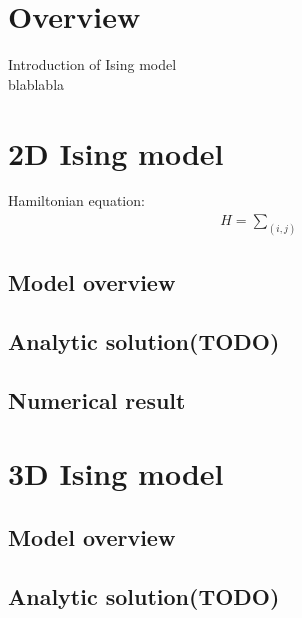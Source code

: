 \documentclass[%
 reprint,
 amsmath,amssymb,
 aps,
]{revtex4-1}
\begin{document}
\maketitle


\section{\label{sec:level1}Overview}
Introduction of Ising model\\

blablabla

\section{\label{sec:level1}2D Ising model}

Hamiltonian equation:
\begin{align}
    H = \sum_(i,j)
\end{align}

\subsection{\label{sec:level1}Model overview}


\subsection{\label{sec:level1}Analytic solution(TODO)}


\subsection{\label{sec:level1}Numerical result}

\section{\label{sec:level1}3D Ising model}

\subsection{\label{sec:level1}Model overview}


\subsection{\label{sec:level1}Analytic solution(TODO)}
\end{document}

